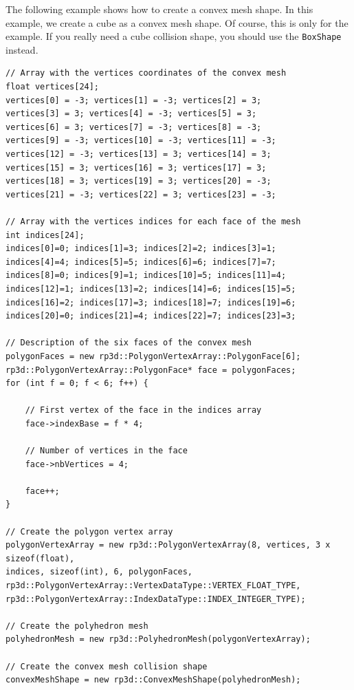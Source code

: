 \documentclass[a4paper,12pt]{article}
\begin{document}
    The following example shows how to create a convex mesh shape. In this example, we create a cube as a convex mesh shape. Of course, this is only for the example.
    If you really need a cube collision shape, you should use the \texttt{BoxShape} instead. \\

    \begin{lstlisting}
// Array with the vertices coordinates of the convex mesh
float vertices[24];
vertices[0] = -3; vertices[1] = -3; vertices[2] = 3;
vertices[3] = 3; vertices[4] = -3; vertices[5] = 3;
vertices[6] = 3; vertices[7] = -3; vertices[8] = -3;
vertices[9] = -3; vertices[10] = -3; vertices[11] = -3;
vertices[12] = -3; vertices[13] = 3; vertices[14] = 3;
vertices[15] = 3; vertices[16] = 3; vertices[17] = 3;
vertices[18] = 3; vertices[19] = 3; vertices[20] = -3;
vertices[21] = -3; vertices[22] = 3; vertices[23] = -3;

// Array with the vertices indices for each face of the mesh
int indices[24];
indices[0]=0; indices[1]=3; indices[2]=2; indices[3]=1;
indices[4]=4; indices[5]=5; indices[6]=6; indices[7]=7;
indices[8]=0; indices[9]=1; indices[10]=5; indices[11]=4;
indices[12]=1; indices[13]=2; indices[14]=6; indices[15]=5;
indices[16]=2; indices[17]=3; indices[18]=7; indices[19]=6;
indices[20]=0; indices[21]=4; indices[22]=7; indices[23]=3;

// Description of the six faces of the convex mesh
polygonFaces = new rp3d::PolygonVertexArray::PolygonFace[6];
rp3d::PolygonVertexArray::PolygonFace* face = polygonFaces;
for (int f = 0; f < 6; f++) {

    // First vertex of the face in the indices array
    face->indexBase = f * 4;   

    // Number of vertices in the face
    face->nbVertices = 4;

    face++;
}

// Create the polygon vertex array
polygonVertexArray = new rp3d::PolygonVertexArray(8, vertices, 3 x sizeof(float),
indices, sizeof(int), 6, polygonFaces,
rp3d::PolygonVertexArray::VertexDataType::VERTEX_FLOAT_TYPE,
rp3d::PolygonVertexArray::IndexDataType::INDEX_INTEGER_TYPE);

// Create the polyhedron mesh
polyhedronMesh = new rp3d::PolyhedronMesh(polygonVertexArray);

// Create the convex mesh collision shape
convexMeshShape = new rp3d::ConvexMeshShape(polyhedronMesh);
  \end{lstlisting}
\end{document}
